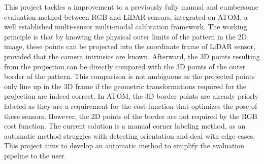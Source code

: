 This project tackles a improvement to a previously fully manual and cumbersome evaluation method between RGB and LiDAR sensors,
integrated on ATOM, a well established multi-sensor multi-modal calibration framework. The working principle is that by knowing the
physical outer limits of the pattern in the 2D image, these points can be projected into the coordinate frame of LiDAR sensor, provided
that the camera intrinsics are known. Afterward, the 3D points resulting from the projection can be directly compared with the 3D
points of the outer border of the pattern. This comparison is not ambiguous as the projected points only line up in the 3D frame if the
geometric transformations required for the projection are indeed correct. In ATOM, the 3D border points are already priorly labeled as
they are a requirement for the cost function that optimizes the pose of these sensors. However, the 2D points of the border are not
required by the RGB cost function. The current solution is a manual corner labeling method, as an automatic method struggles
with detecting orientation and deal with edge cases. This project aims to develop an automatic method to simplify the evaluation
pipeline to the user.